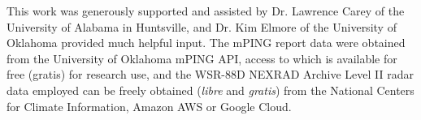 \documentclass{agujournal}
\begin{document}
%

%




%
%
%
%
%
%
%


\acknowledgments
This work was generously supported and assisted by Dr. Lawrence Carey of the University of Alabama in Huntsville, and Dr. Kim Elmore of the University of Oklahoma provided much helpful input. The mPING report data were obtained from the University of Oklahoma mPING API, access to which is available for free (gratis) for research use, and the WSR-88D NEXRAD Archive Level II radar data employed can be freely obtained (\textit{libre} and \textit{gratis}) from the National Centers for Climate Information, Amazon AWS or Google Cloud.



\end{document}
